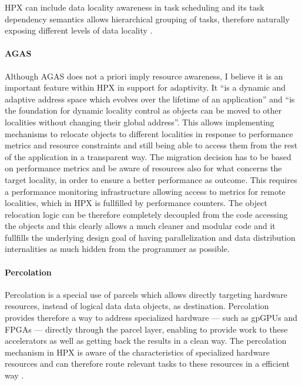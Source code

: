 HPX can include data locality awareness in task scheduling and its task dependency semantics allows hierarchical grouping of tasks, therefore naturally exposing different levels of data locality \cite{amatya2014parallel}.


\paragraph{AGAS}
Although AGAS does not a priori imply resource awareness, I believe it is an important feature within HPX in support for adaptivity. It ``is a dynamic and adaptive address space
which evolves over the lifetime of an application'' and ``is the foundation for dynamic locality control as objects can be moved to other localities without changing their global address''.\cite{kaiser2014hpx}
This allows implementing mechanisms to relocate objects to different localities in response to performance metrics and resource constraints \cite{amatya2014parallel} and still being able to access them from the rest of the application in a transparent way. The migration decision has to be based on performance metrics and be aware of resources also for what concerns the target locality, in order to ensure a better performance as outcome. This requires a performance monitoring infrastructure allowing access to metrics for remote localities, which in HPX is fullfilled by performance counters.
The object relocation logic can be therefore completely decoupled from the code accessing the objects and this clearly allows a much cleaner and modular code and it fullfills the underlying design goal of having parallelization and data distribution internalities as much hidden from the programmer as possible.
~\\ 

\paragraph{Percolation}
Percolation is a special use of parcels which allows directly targeting hardware resources, instead of logical data data objects, as destination.
Percolation provides therefore a way to address specialized hardware --- such as gpGPUs and FPGAs --- directly through the parcel layer, enabling to provide work to these accelerators as well as getting back the results in a clean way.
The percolation mechanism in HPX is aware of the characteristics of specialized hardware resources and can therefore route relevant tasks to these resources in a efficient way \cite{amatya2014parallel}.
~\\ 

